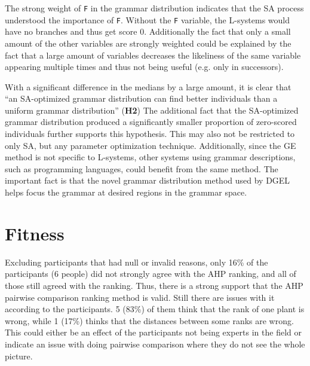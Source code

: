 The strong weight of \texttt{F} in the grammar distribution indicates that the \gls{SA} process understood the importance of \texttt{F}.
Without the \texttt{F} variable, the \glspl{L-system} would have no branches and thus get score 0.
Additionally the fact that only a small amount of the other variables are strongly weighted could be explained by the fact that a large amount of variables decreases the likeliness of the same variable appearing multiple times and thus not being useful (e.g. only in successors).

With a significant difference in the medians by a large amount, it is clear that ``an \gls{SA}-optimized grammar distribution can find better individuals than a uniform grammar distribution'' (\textbf{H2})
The additional fact that the \gls{SA}-optimized grammar distribution produced a significantly smaller proportion of zero-scored individuals further supports this hypothesis.
This may also not be restricted to only \gls{SA}, but any parameter optimization technique.
Additionally, since the \gls{GE} method is not specific to \glspl{L-system}, other systems using grammar descriptions, such as programming languages, could benefit from the same method.
The important fact is that the novel grammar distribution method used by \gls{DGEL} helps focus the grammar at desired regions in the grammar space.


\section{Fitness}
Excluding participants that had null or invalid reasons, only 16\% of the participants (6 people) did not strongly agree with the \gls{AHP} ranking, and all of those still agreed with the ranking.
Thus, there is a strong support that the \gls{AHP} pairwise comparison ranking method is valid.
Still there are issues with it according to the participants.
5 (83\%) of them think that the rank of one plant is wrong, while 1 (17\%) thinks that the distances between some ranks are wrong.
This could either be an effect of the participants not being experts in the field or indicate an issue with doing pairwise comparison where they do not see the whole picture.

